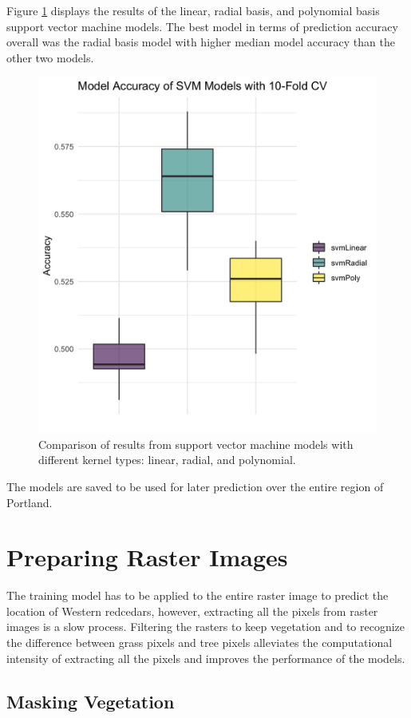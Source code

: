 \documentclass[12pt,twoside]{reedthesis}
\begin{document}
Figure \ref{fig:svmresults} displays the results of the linear, radial basis, and polynomial basis support vector machine models. The best model in terms of prediction accuracy overall was the radial basis model with higher median model accuracy than the other two models.
\begin{figure}

{\centering \includegraphics[width=0.4\linewidth]{figure/svmresults} 

}

\caption{Comparison of results from support vector machine models with different kernel types: linear, radial, and polynomial.}\label{fig:svmresults}
\end{figure}
The models are saved to be used for later prediction over the entire region of Portland.

\hypertarget{preparing-raster-images}{%
\section{Preparing Raster Images}\label{preparing-raster-images}}

The training model has to be applied to the entire raster image to predict the location of Western redcedars, however, extracting all the pixels from raster images is a slow process. Filtering the rasters to keep vegetation and to recognize the difference between grass pixels and tree pixels alleviates the computational intensity of extracting all the pixels and improves the performance of the models.

\hypertarget{masking-vegetation}{%
\subsection{Masking Vegetation}\label{masking-vegetation}}
\end{document}

